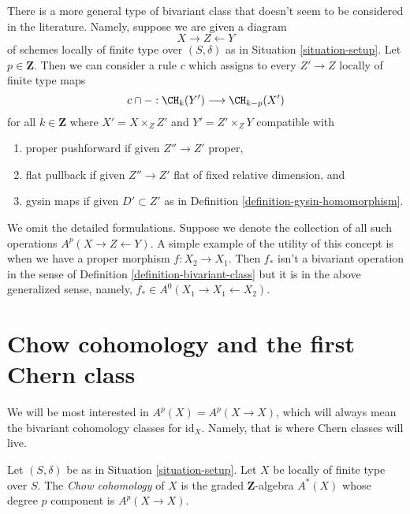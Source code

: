 \begin{remark}
\label{remark-more-general-bivariant}
There is a more general type of bivariant class that doesn't seem to be
considered in the literature. Namely, suppose we are given a diagram
$$
X \longrightarrow Z \longleftarrow Y
$$
of schemes locally of finite type over $(S, \delta)$ as in
Situation \ref{situation-setup}. Let $p \in \mathbf{Z}$.
Then we can consider a rule $c$ which assigns to every $Z' \to Z$
locally of finite type maps
$$
c \cap - : \CH_k(Y') \longrightarrow \CH_{k - p}(X')
$$
for all $k \in \mathbf{Z}$
where $X' = X \times_Z Z'$ and $Y' = Z' \times_Z Y$ compatible with
\begin{enumerate}
\item proper pushforward if given $Z'' \to Z'$ proper,
\item flat pullback if given $Z'' \to Z'$ flat
of fixed relative dimension, and
\item gysin maps if given $D' \subset Z'$ as in
Definition \ref{definition-gysin-homomorphism}.
\end{enumerate}
We omit the detailed formulations. Suppose we denote the collection
of all such operations $A^p(X \to Z \leftarrow Y)$. A simple example
of the utility of this concept is when we have a proper morphism
$f : X_2 \to X_1$. Then $f_*$ isn't a bivariant operation in the sense of
Definition \ref{definition-bivariant-class} but it is in the
above generalized sense, namely, $f_* \in A^0(X_1 \to X_1 \leftarrow X_2)$.
\end{remark}





\section{Chow cohomology and the first Chern class}
\label{section-chow-cohomology}

\noindent
We will be most interested in $A^p(X) = A^p(X \to X)$, which will always mean
the bivariant cohomology classes for $\text{id}_X$. Namely, that is where
Chern classes will live.

\begin{definition}
\label{definition-chow-cohomology}
Let $(S, \delta)$ be as in Situation \ref{situation-setup}.
Let $X$ be locally of finite type over $S$. The {\it Chow cohomology}
of $X$ is the graded $\mathbf{Z}$-algebra $A^*(X)$ whose degree
$p$ component is $A^p(X \to X)$.
\end{definition}

